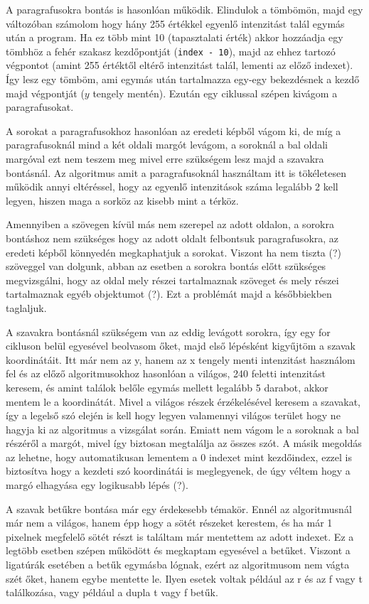 
A paragrafusokra bontás is hasonlóan működik. Elindulok a tömbömön, majd egy változóban számolom hogy hány 255 értékkel egyenlő intenzitást talál egymás után a program. Ha ez több mint 10 (tapasztalati érték) akkor hozzáadja egy tömbhöz a fehér szakasz kezdőpontját (\texttt{index - 10}), majd az ehhez tartozó végpontot (amint 255 értéktől eltérő intenzitást talál, lementi az előző indexet). Így lesz egy tömböm, ami egymás után tartalmazza egy-egy bekezdésnek a kezdő majd végpontját ($y$ tengely mentén). Ezután egy ciklussal szépen kivágom a paragrafusokat.

A sorokat a paragrafusokhoz hasonlóan az eredeti képből vágom ki, de míg a paragrafusoknál mind a két oldali margót levágom, a soroknál a bal oldali margóval ezt nem teszem meg mivel erre szükségem lesz majd a szavakra bontásnál. Az algoritmus amit a paragrafusoknál használtam itt is tökéletesen működik annyi eltéréssel, hogy az egyenlő intenzitások száma legalább 2 kell legyen, hiszen maga a sorköz az kisebb mint a térköz.

Amennyiben a szövegen kívül más nem szerepel az adott oldalon, a sorokra bontáshoz nem szükséges hogy az adott oldalt felbontsuk paragrafusokra, az eredeti képből könnyedén megkaphatjuk a sorokat. Viszont ha nem tiszta (?) szöveggel van dolgunk, abban az esetben a sorokra bontás előtt szükséges megvizsgálni, hogy az oldal mely részei tartalmaznak szöveget és mely részei tartalmaznak egyéb objektumot (?). Ezt a problémát majd a későbbiekben taglaljuk.

A szavakra bontásnál szükségem van az eddig levágott sorokra, így egy for cikluson belül egyesével beolvasom őket, majd első lépésként kigyűjtöm a szavak koordinátáit. Itt már nem az y, hanem az x tengely menti intenzitást használom fel és az előző algoritmusokhoz hasonlóan a világos, 240 feletti intenzitást keresem, és amint találok belőle egymás mellett legalább 5 darabot, akkor mentem le a koordinátát. Mivel a világos részek érzékelésével keresem a szavakat, így a legelső szó elején is kell hogy legyen valamennyi világos terület hogy ne hagyja ki az algoritmus a vizsgálat során. Emiatt nem vágom le a soroknak a bal részéről a margót, mivel így biztosan megtalálja az összes szót. A másik megoldás az lehetne, hogy automatikusan lementem a 0 indexet mint kezdőindex, ezzel is biztosítva hogy a kezdeti szó koordinátái is meglegyenek, de úgy véltem hogy a margó elhagyása egy logikusabb lépés (?).

A szavak betűkre bontása már egy érdekesebb témakör. Ennél az algoritmusnál már nem a világos, hanem épp hogy a sötét részeket kerestem, és ha már 1 pixelnek megfelelő sötét részt is találtam már mentettem az adott indexet. Ez a legtöbb esetben szépen működött és megkaptam egyesével a betűket. Viszont a ligatúrák esetében a betűk egymásba lógnak, ezért az algoritmusom nem vágta szét őket, hanem egybe mentette le. Ilyen esetek voltak például az r és az f vagy t találkozása, vagy például a dupla t vagy f betűk.

